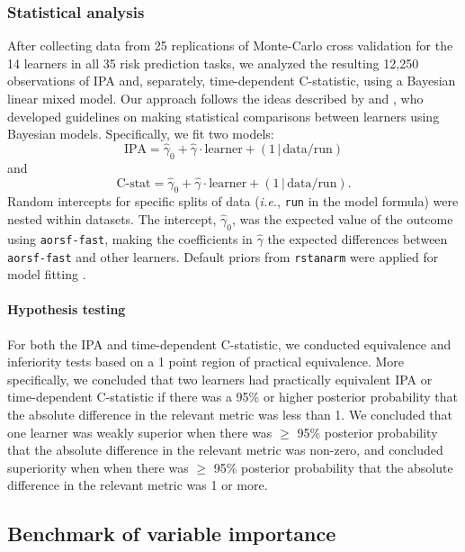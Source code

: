 \documentclass[12pt]{article}\usepackage[]{graphicx}\usepackage[]{xcolor}
\newcommand{\ie}{\textit{i.e.}}
\begin{document}
\subsubsection{Statistical analysis}

After collecting data from 25 replications of Monte-Carlo cross validation for the 14 learners in all 35 risk prediction tasks, we analyzed the resulting 12,250 observations of IPA and, separately, time-dependent C-statistic, using a Bayesian linear mixed model. Our approach follows the ideas described by \citet{benavoli2017time} and \citet{tidymodels}, who developed guidelines on making statistical comparisons between learners using Bayesian models. Specifically, we fit two models: $$\text{IPA} = \widehat{\gamma}_0 + \widehat{\gamma} \cdot \text{learner} + (1\,|\, \text{data/run}) $$ and $$\text{C-stat} = \widehat{\gamma}_0 + \widehat{\gamma} \cdot \text{learner} + (1\,|\, \text{data/run}).$$ Random intercepts for specific splits of data (\ie, \texttt{run} in the model formula) were nested within datasets. The intercept, $\widehat{\gamma}_0$, was the expected value of the outcome using \texttt{aorsf-fast}, making the coefficients in $\widehat{\gamma}$ the expected differences between \texttt{aorsf-fast} and other learners. Default priors from \texttt{rstanarm} were applied for model fitting \citep{rstanarm}.

\paragraph{Hypothesis testing} For both the IPA and time-dependent C-statistic, we conducted equivalence and inferiority tests based on a 1 point region of practical equivalence. More specifically, we concluded that two learners had practically equivalent IPA or time-dependent C-statistic if there was a 95\% or higher posterior probability that the absolute difference in the relevant metric was less than 1. We concluded that one learner was weakly superior when there was $\geq$ 95\% posterior probability that the absolute difference in the relevant metric was non-zero, and concluded superiority when when there was $\geq$ 95\% posterior probability that the absolute difference in the relevant metric was 1 or more.




\subsection{Benchmark of variable importance} \label{sec:bm_vi}
\end{document}
